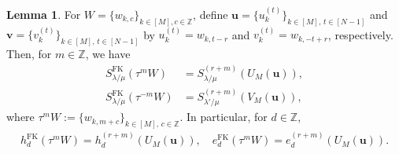 \documentclass[12pt]{amsart}%
\theoremstyle{definition}
\newtheorem{lemma}[theorem]{Lemma}
\DeclareMathOperator{\SSYT}{SSYT}
\newcommand{\bu}{\boldsymbol u}
\newcommand{\bv}{\boldsymbol v}
\newcommand{\FK}{\mathrm{FK}}
\begin{document}
\begin{lemma}
\label{lemma:nnsy to fk}
For $W=\{w_{k,c}\}_{k\in [M],c\in\mathbb{Z}}$,
define 
$\bu=\{u^{(t)}_{k}\}_{k\in[M],\,t\in [N-1]}$ and 
$\bv=\{v^{(t)}_{k}\}_{k\in[M],\,t\in [N-1]}$
by $u^{(t)}_k=w_{k,t-r}$ and 
$v^{(t)}_k=w_{k,-t+r}$, respectively.
Then, for $m\in\mathbb{Z}$, we have  
\begin{align}
\label{for:nnsy to fk by U}
 S^{\FK}_{\lambda/\mu}(\tau^{m}W)
&=S^{(r+m)}_{\lambda/\mu}(U_M(\bu)),\\
\label{for:nnsy to fk by V}
 S^{\FK}_{\lambda/\mu}(\tau^{-m}W)
&=S^{(r+m)}_{\lambda'/\mu}(V_M(\bu)),
\end{align}
where $\tau^m W:=\{w_{k,m+c}\}_{k\in [M],\,c\in\mathbb{Z}}$.
In particular, for $d\in\mathbb{Z}$, 
\begin{align*}
h^{\FK}_d(\tau^{m}W)=h^{(r+m)}_d(U_M(\bu)), \quad  
e^{\FK}_d(\tau^{m}W)=e^{(r+m)}_d(U_M(\bu)).
\end{align*}
\end{lemma}
\end{document}
